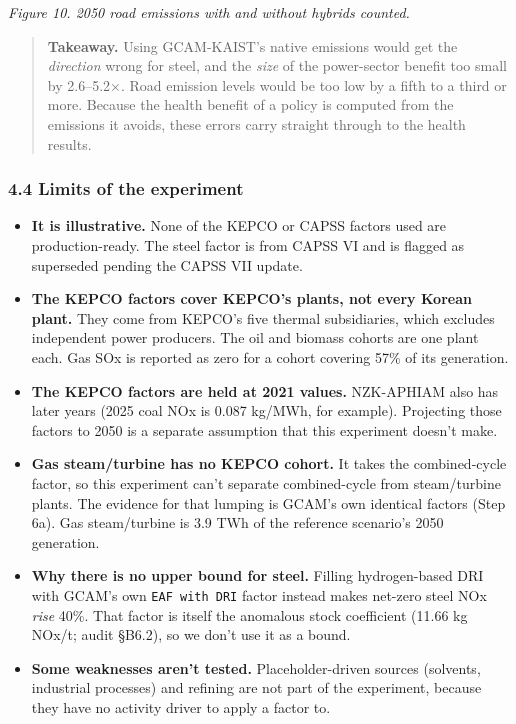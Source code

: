 \emph{Figure
10. 2050
road
emissions
with and
without
hybrids
counted.}

\begin{quote}
\plainmark{}
\textbf{Takeaway.}
Using
GCAM-KAIST's
native
emissions
would get
the
\emph{direction}
wrong for
steel, and
the
\emph{size}
of the
power-sector
benefit too small by 2.6--5.2×.
Road
emission
levels
would be
too low by
a fifth to
a third or
more.
Because
the health
benefit of
a policy
is
computed
from the
emissions
it avoids,
these
errors
carry
straight
through to
the health
results.
\end{quote}

\hypertarget{limits-of-the-experiment}{%
\subsubsection*{4.4 Limits of the experiment}\label{limits-of-the-experiment}}

\begin{itemize}
\tightlist
\item
  \textbf{It is illustrative.} None of the KEPCO or CAPSS factors used are
  production-ready. The steel factor is from CAPSS VI and is flagged as
  superseded pending the CAPSS VII update.
\item
  \textbf{The KEPCO factors cover KEPCO's plants, not every Korean plant.}
  They come from KEPCO's five thermal subsidiaries, which excludes independent
  power producers. The oil and biomass cohorts are one plant each. Gas SOx is
  reported as zero for a cohort covering 57\% of its generation.
\item
  \textbf{The KEPCO factors are held at 2021 values.} NZK-APHIAM also has
  later years (2025 coal NOx is 0.087 kg/MWh, for example). Projecting those
  factors to 2050 is a separate assumption that this experiment doesn't make.
\item
  \textbf{Gas steam/turbine has no KEPCO cohort.} It takes the combined-cycle
  factor, so this experiment can't separate combined-cycle from steam/turbine
  plants. The evidence for that lumping is GCAM's own identical factors (Step
  6a). Gas steam/turbine is 3.9 TWh of the reference scenario's 2050
  generation.
\item
  \textbf{Why
  there is
  no upper
  bound
  for
  steel.}
  Filling
  hydrogen-based
  DRI with
  GCAM's
  own
  \texttt{EAF\ with\ DRI}
  factor
  instead
  makes
  net-zero
  steel
  NOx
  \emph{rise}
  40\%.
  That
  factor
  is
  itself
  the
  anomalous
  stock
  coefficient
  (11.66
  kg
  NOx/t;
  audit
  §B6.2),
  so we
  don't
  use it
  as a
  bound.
\item
  \textbf{Some
  weaknesses
  aren't
  tested.}
  Placeholder-driven
  sources
  (solvents,
  industrial
  processes)
  and
  refining
  are not
  part of
  the
  experiment,
  because
  they
  have no
  activity
  driver
  to apply
  a factor
  to.
\end{itemize}

